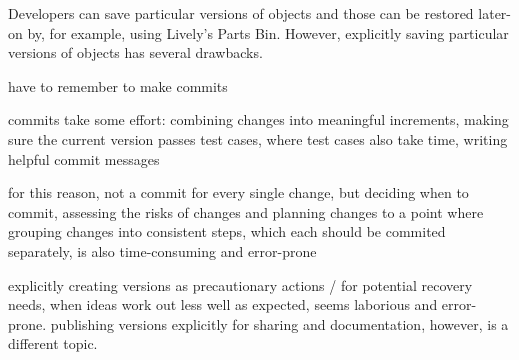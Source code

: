 Developers can save particular versions of objects and those can be restored later-on by, for example, using Lively's Parts Bin.
However, explicitly saving particular versions of objects has several drawbacks.


have to remember to make commits

commits take some effort: combining changes into meaningful increments, making sure the current version passes test cases, where test cases also take time, writing helpful commit messages

for this reason, not a commit for every single change, but deciding when to commit, assessing the risks of changes and planning changes to a point where grouping changes into consistent steps, which each should be commited separately, is also time-consuming and error-prone

explicitly creating versions as precautionary actions / for potential recovery needs, when ideas work out less well as expected, seems laborious and error-prone.
publishing versions explicitly for sharing and documentation, however, is a different topic.

% 


